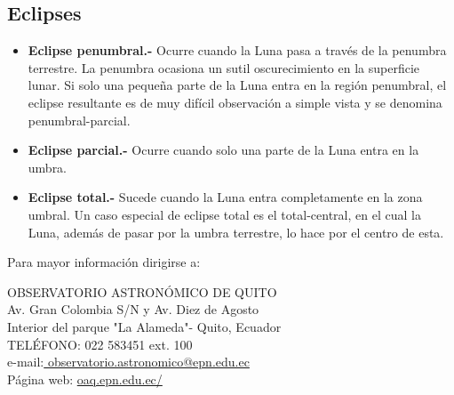 \documentclass[12pt,a4paper,oneside]{article}
\begin{document}
\subsection{Eclipses}
\begin{itemize}
\item \textbf{ Eclipse penumbral.-} Ocurre cuando la Luna pasa a trav\'es de la penumbra terrestre. La penumbra ocasiona un sutil oscurecimiento en la superficie lunar. Si solo una pequeña parte de la Luna entra en la regi\'on penumbral, el eclipse resultante es de muy dif\'icil observaci\'on a simple vista y se denomina penumbral-parcial.
\item \textbf{Eclipse parcial.-} Ocurre cuando solo una parte de la Luna entra en la umbra.
\item \textbf{ Eclipse total.-} Sucede cuando la Luna entra completamente en la zona umbral. Un caso especial de eclipse total es el total-central, en el cual la Luna, adem\'as de pasar por la umbra terrestre, lo hace por el centro de esta.
\end{itemize}
\vspace{3cm}
Para mayor informaci\'on dirigirse a: \\
\begin{center}
OBSERVATORIO ASTRONÓMICO DE QUITO\\
\footnotesize Av. Gran Colombia S/N y Av. Diez de Agosto\\
\footnotesize Interior del parque "La Alameda"- Quito, Ecuador \\

\footnotesize TEL\'EFONO:  022 583451 ext. 100\\



\footnotesize e-mail:\url{ observatorio.astronomico@epn.edu.ec}\\
\footnotesize P\'agina web: \url{oaq.epn.edu.ec/}
\end{center}
\end{document}
